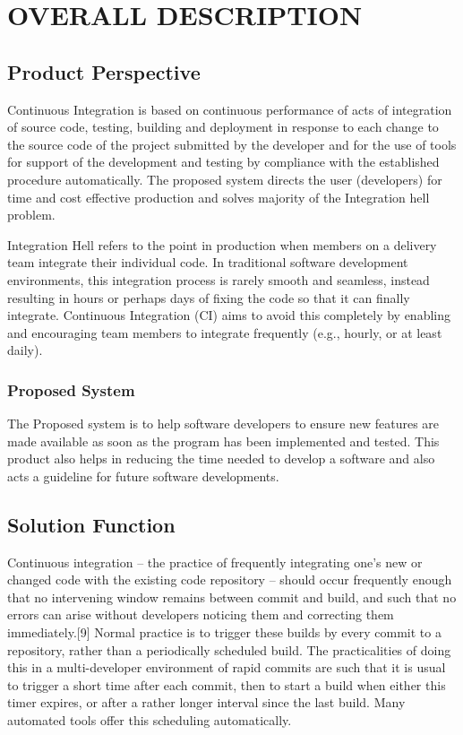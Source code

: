 \documentclass[12pt,a4paper,oneside]{report}
\begin{document}
\chapter{OVERALL DESCRIPTION}
\section{Product Perspective}
\par
Continuous Integration is based on continuous performance of acts of integration of
source code, testing, building and deployment in response to each change to the source code of
the project submitted by the developer and for the use of tools for support of the development
and testing by compliance with the established procedure automatically. The proposed system
directs the user (developers) for time and cost effective production and solves majority of the
Integration hell problem. \par
Integration Hell refers to the point in production when members on a delivery team integrate
their individual code. In traditional software development environments, this integration
process is rarely smooth and seamless, instead resulting in hours or perhaps days of fixing the
code so that it can finally integrate. Continuous Integration (CI) aims to avoid this completely
by enabling and encouraging team members to integrate frequently (e.g., hourly, or at least
daily).

\subsection{Proposed System}
\par 
The Proposed system is to help software developers to ensure new features are made
available as soon as the program has been implemented and tested. This product also helps in
reducing the time needed to develop a software and also acts a guideline for future software
developments.
\section{Solution Function}

\par Continuous integration – the practice of frequently integrating one's new or changed code with the existing code repository – should occur frequently enough that no intervening window remains between commit and build, and such that no errors can arise without developers noticing them and correcting them immediately.[9] Normal practice is to trigger these builds by every commit to a repository, rather than a periodically scheduled build. The practicalities of doing this in a multi-developer environment of rapid commits are such that it is usual to trigger a short time after each commit, then to start a build when either this timer expires, or after a rather longer interval since the last build. Many automated tools offer this scheduling automatically.
\end{document}
